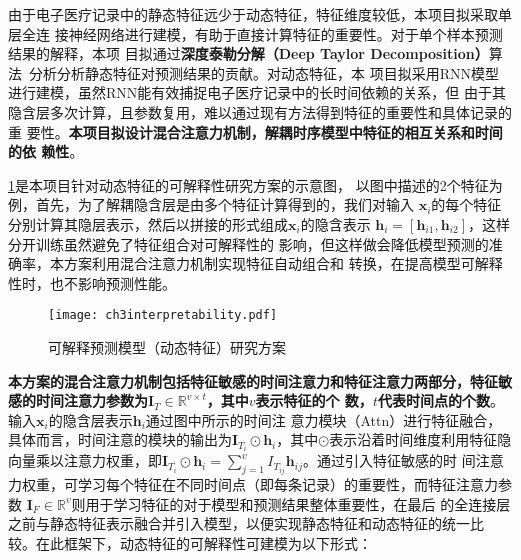 由于电子医疗记录中的静态特征远少于动态特征，特征维度较低，本项目拟采取单层全连
接神经网络进行建模，有助于直接计算特征的重要性。对于单个样本预测结果的解释，本项
目拟通过\textbf{深度泰勒分解（Deep Taylor Decomposition）}算法~分析分析静态特征对预测结果的贡献。对动态特征，本
项目拟采用RNN模型进行建模，虽然RNN能有效捕捉电子医疗记录中的长时间依赖的关系，但
由于其隐含层多次计算，且参数复用，难以通过现有方法得到特征的重要性和具体记录的重
要性。\textbf{本项目拟设计混合注意力机制，解耦时序模型中特征的相互关系和时间的依
赖性}。

\cref{fig:ch3:interpretability}是本项目针对动态特征的可解释性研究方案的示意图，
以图中描述的2个特征为例，首先，为了解耦隐含层是由多个特征计算得到的，我们对输入
$\bm x_i$的每个特征分别计算其隐层表示，然后以拼接的形式组成$\bm x_i$的隐含表示
$\bm h_i = [\bm h_{i1}, \bm h_{i2}]$，这样分开训练虽然避免了特征组合对可解释性的
影响，但这样做会降低模型预测的准确率，本方案利用混合注意力机制实现特征自动组合和
转换，在提高模型可解释性时，也不影响预测性能。

\begin{figure}
    \begin{small}
        \begin{center}
            \texttt{[image: ch3interpretability.pdf]}
        \end{center}
        \caption{可解释预测模型（动态特征）研究方案}
        \label{fig:ch3:interpretability}
    \end{small}
\end{figure}

\textbf{本方案的混合注意力机制包括特征敏感的时间注意力和特征注意力两部分，特征敏
感的时间注意力参数为$\bm I_T \in \mathbb R^{v \times t}$，其中$v$表示特征的个
数，$t$代表时间点的个数}。输入$\bm x_i$的隐含层表示$\bm h_i$通过图中所示的时间注
意力模块（Attn）进行特征融合，具体而言，时间注意的模块的输出为$\bm I_{T_i} \odot
\bm h_i$，其中$\odot$表示沿着时间维度利用特征隐向量乘以注意力权重，即$\bm
I_{T_i} \odot \bm h_i= \sum_{j=1}^v I_{T_{ij}} \bm h_{ij}$。通过引入特征敏感的时
间注意力权重，可学习每个特征在不同时间点（即每条记录）的重要性，而特征注意力参数
$\bm I_F \in \mathbb R^{v}$则用于学习特征的对于模型和预测结果整体重要性，在最后
的全连接层之前与静态特征表示融合并引入模型，以便实现静态特征和动态特征的统一比
较。在此框架下，动态特征的可解释性可建模为以下形式：

